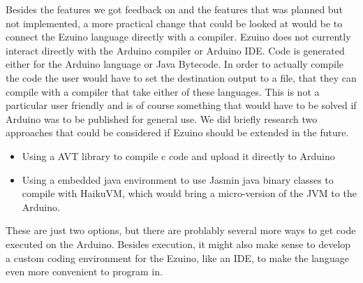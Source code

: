 Besides the features we got feedback on and the features that was planned but not implemented, a more practical change that could be looked at would be to connect the Ezuino language directly with a compiler. Ezuino does not currently interact directly with the Arduino compiler or Arduino IDE. Code is generated either for the Arduino language or Java Bytecode. In order to actually compile the code the user would have to set the destination output to a file, that they can compile with a compiler that take either of these languages. This is not a particular user friendly and is of course something that would have to be solved if Arduino was to be published for general use. We did briefly research two approaches that could be considered if Ezuino should be extended in the future.
\begin{itemize}
    \item Using a AVT library to compile c code and upload it directly to Arduino
    \item Using a embedded java environment to use Jasmin java binary classes to compile with HaikuVM\cite{haiku}, which would bring a micro-version of the JVM to the Arduino.
\end{itemize}
These are just two options, but there are problably several more ways to get code executed on the Arduino. Besides execution, it might also make sense to develop a custom coding environment for the Ezuino, like an IDE, to make the language even more convenient to program in. 


